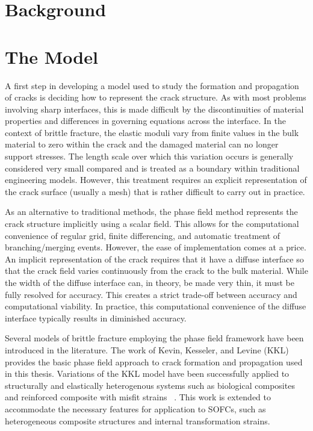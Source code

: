 \section{Background}

\section{The Model}

A first step in developing a model used to study the formation and propagation of cracks is deciding how to represent the crack structure. As with most problems involving sharp interfaces, this is made difficult by the discontinuities of material properties and differences in governing equations across the interface. In the context of brittle fracture, the elastic moduli vary from finite values in the bulk material to zero within the crack and the damaged material can no longer support stresses. The length scale over which this variation occurs is generally considered very small compared and is treated as a boundary within traditional engineering models. However, this treatment requires an explicit representation of the crack surface (usually a mesh) that is rather difficult to carry out in practice. 

As an alternative to traditional methods, the phase field method represents the crack structure implicitly using a scalar field. This allows for the computational convenience of regular grid, finite differencing, and automatic treatment of branching/merging events. However, the ease of implementation comes at a price. An implicit representation of the crack requires that it have a diffuse interface so that the crack field varies continuously from the crack to the bulk material. While the width of the diffuse interface can, in theory, be made very thin, it must be fully resolved for accuracy. This creates a strict trade-off between accuracy and computational viability. In practice, this computational convenience of the diffuse interface typically results in diminished accuracy.  

Several models of brittle fracture employing the phase field framework have been introduced in the literature. The work of Kevin, Kesseler, and Levine (KKL) provides the basic phase field approach to crack formation and propagation used in this thesis. Variations of the KKL model have been successfully applied to structurally and elastically heterogenous systems such as biological composites~\cite{Murali2011} and reinforced composite with misfit strains~\cite{Biner2009} . This work is extended to accommodate the necessary features for application to SOFCs, such as heterogeneous composite structures and internal transformation strains.  

